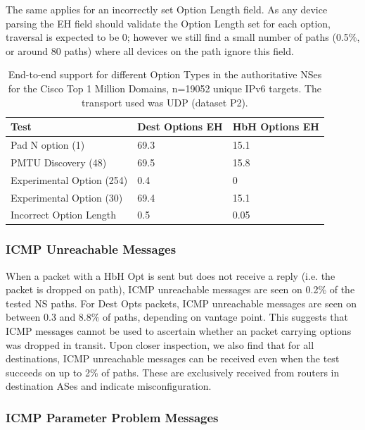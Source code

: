 \documentclass[conference]{IEEEtran}
\begin{document}
The same applies for an incorrectly set Option Length field. As any device parsing the EH field should validate the Option Length set for each option, traversal is expected to be 0; however we still find a small number of paths (0.5\%, or around 80 paths) where all devices on the path ignore this field.

\begin{table}[]
\begin{tabular}{l|l|l}
Test                      & Dest Options EH & HbH Options EH \\
\hline
Pad N option (1)          & 69.3           & 15.1          \\
PMTU Discovery (48)       & 69.5           & 15.8          \\
Experimental Option (254) & 0.4            & 0             \\
Experimental Option (30)  & 69.4           & 15.1          \\
Incorrect Option Length   & 0.5            & 0.05            
\end{tabular}
\label{tbl:option_type_support}
\caption{End-to-end support for different Option Types in the authoritative NSes for the Cisco Top 1 Million Domains, n=19052 unique IPv6 targets. The transport used was UDP (dataset P2).}
\end{table}

\subsubsection{ICMP Unreachable Messages}

When a packet with a HbH Opt is sent but does not receive a reply (i.e. the packet is dropped on path),  ICMP unreachable messages are seen on 0.2\% of the tested NS paths. For Dest Opts packets, ICMP unreachable messages are seen on between 0.3 and 8.8\% of paths, depending on vantage point.
This suggests that ICMP messages cannot be used to ascertain whether an packet carrying options was dropped in transit.
Upon closer inspection, we also find that for all destinations, ICMP unreachable messages can be received even when the test succeeds on up to 2\% of paths. These are exclusively received from routers in destination ASes and indicate misconfiguration.


\subsubsection{ICMP Parameter Problem Messages}
\end{document}
